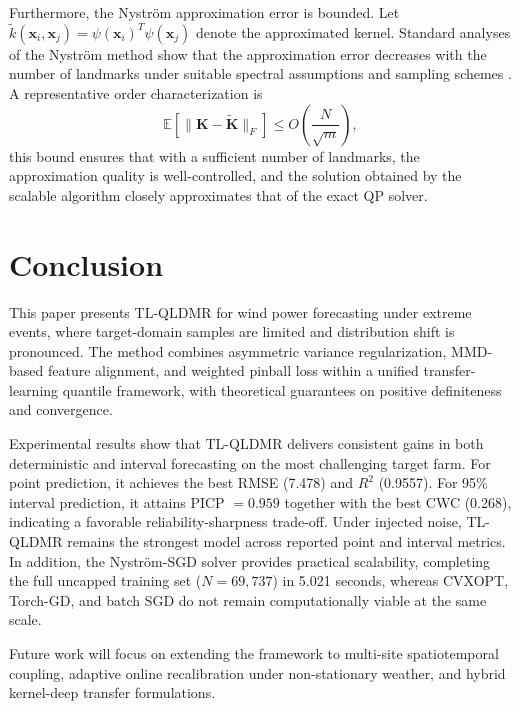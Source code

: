 \documentclass[a4paper]{cas-sc}
\begin{document}
Furthermore, the Nystr\"{o}m approximation error is bounded. Let $\tilde{k}(\boldsymbol{x}_i, \boldsymbol{x}_j) = \psi(\boldsymbol{x}_i)^T \psi(\boldsymbol{x}_j)$ denote the approximated kernel. Standard analyses of the Nystr\"{o}m method show that the approximation error decreases with the number of landmarks under suitable spectral assumptions and sampling schemes \citep{kumar2012sampling, zhang2010clustered}. A representative order characterization is
\begin{equation}
\label{eq:nystrom_error}
\mathbb{E}\left[ \| \boldsymbol{K} - \tilde{\boldsymbol{K}} \|_F \right] \le O\left( \frac{N}{\sqrt{m}} \right),
\end{equation}
this bound ensures that with a sufficient number of landmarks, the approximation quality is well-controlled, and the solution obtained by the scalable algorithm closely approximates that of the exact QP solver.





\section{Conclusion}\label{conclusion}
This paper presents TL-QLDMR for wind power forecasting under extreme events, where target-domain samples are limited and distribution shift is pronounced. The method combines asymmetric variance regularization, MMD-based feature alignment, and weighted pinball loss within a unified transfer-learning quantile framework, with theoretical guarantees on positive definiteness and convergence.

Experimental results show that TL-QLDMR delivers consistent gains in both deterministic and interval forecasting on the most challenging target farm. For point prediction, it achieves the best RMSE (7.478) and $R^2$ (0.9557). For 95\% interval prediction, it attains PICP $=0.959$ together with the best CWC (0.268), indicating a favorable reliability-sharpness trade-off. Under injected noise, TL-QLDMR remains the strongest model across reported point and interval metrics. In addition, the Nystr\"{o}m-SGD solver provides practical scalability, completing the full uncapped training set ($N=69{,}737$) in 5.021 seconds, whereas CVXOPT, Torch-GD, and batch SGD do not remain computationally viable at the same scale.

Future work will focus on extending the framework to multi-site spatiotemporal coupling, adaptive online recalibration under non-stationary weather, and hybrid kernel-deep transfer formulations.
\end{document}
